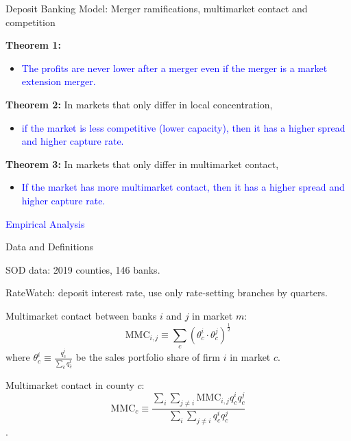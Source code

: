 \documentclass[notes,10.2pt, aspectratio=169]{beamer}
\newenvironment{wideitemize}{\itemize\addtolength{\itemsep}{10pt}}{\enditemize}
\begin{document}
\begin{frame}{ Deposit Banking Model: Merger ramifications, multimarket contact and competition}
  \begin{wideitemize}

    \item \textbf{Theorem 1:} 
    \begin{itemize}
    \item \textcolor{blue}{The profits are never lower after a merger even if the merger is a market extension merger.} 
    \end{itemize}
    
    \pause 
  
    \item \textbf{Theorem 2:}  In markets that only differ in local concentration, 
    \begin{itemize}
      \item \textcolor{blue}{ if the market is less competitive (lower capacity), then it has a higher spread and higher capture rate.} 
      \end{itemize}
      
    \pause 
  
    \item \textbf{Theorem 3:} In markets that only differ in multimarket contact, 
    \begin{itemize}
      \item \textcolor{blue}{ If the market has more multimarket contact, then it has a higher spread and higher capture rate.} 
      \end{itemize}
  
  
  \end{wideitemize}
\end{frame}


\begin{frame}[noframenumbering]
    \textcolor{blue}{\huge{\centerline{Empirical Analysis}}}
\end{frame}

\begin{frame}{Data and Definitions}
    \vspace{0.2cm}

    \begin{wideitemize}

    \item SOD data: 2019 counties, 146 banks.
    \item RateWatch: deposit interest rate, use only rate-setting branches by quarters.
    \item Multimarket contact between banks $i$ and $j$ in market $m$:
    $$\mathrm{MMC}_{i, j} \equiv \sum_c\left(\theta_c^i \cdot \theta_c^j\right)^{\frac{1}{2}}$$
    where $\theta_c^i \equiv \frac{q_c^i}{\sum_{\bar{c}} q_{\bar{c}}^i}$ be the sales portfolio share of firm $i$ in market $c$.

    \item Multimarket contact in county $c$:
    $$\mathrm{MMC}_c \equiv \frac{\sum_i \sum_{j \neq i} \mathrm{MMC}_{i, j} q_c^i q_c^j}{\sum_i \sum_{j \neq i} q_c^i q_c^j}$$.

  \end{wideitemize}
\end{frame}
\end{document}
